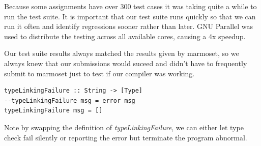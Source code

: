 \documentclass[12pt,letterpaper]{article}
\begin{document}
Because some assignments have over 300 test cases it was taking quite a while to run the test suite.
It is important that our test suite runs quickly so that we can run it often and identify regressions sooner rather than later.
GNU Parallel was used to distribute the testing across all available cores, causing a 4x speedup.

Our test suite results always matched the results given by marmoset, so we always knew that our submissions would suceed and didn't have to frequently submit to marmoset just to test if our compiler was working.
\begin{lstlisting}
typeLinkingFailure :: String -> [Type]
--typeLinkingFailure msg = error msg
typeLinkingFailure msg = []
\end{lstlisting}

Note by swapping the definition of \emph{typeLinkingFailure}, we can either let type check fail silently or reporting the error but terminate the program abnormal.
\end{document}
